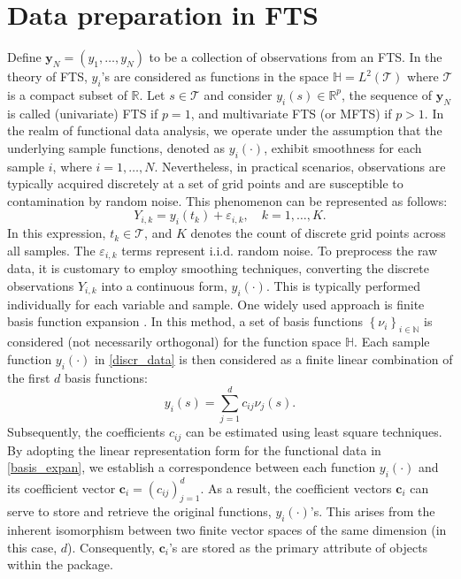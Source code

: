 \section{Data preparation in FTS}\label{sec:preparation}
Define $\textbf{y}_N=(y_1,\ldots,y_N)$ to be a collection of observations from an FTS. In the theory of FTS, $y_i$'s are considered as functions in the space $\mathbb{H}=L^2(\mathcal{T})$ where $\mathcal{T}$ is a compact subset of $\mathbb{R}.$ Let $s\in\mathcal{T}$ and consider $y_i(s)\in\mathbb{R}^p$, the sequence of $\textbf{y}_N$ is called (univariate) FTS if $p=1$, and multivariate FTS (or MFTS) if $p>1.$
In the realm of functional data analysis, we operate under the assumption that the underlying sample functions, denoted as $y_{i}(\cdot)$, exhibit smoothness for each sample $i$, where $i=1, \ldots, N$. Nevertheless, in practical scenarios, observations are typically acquired discretely at a set of grid points and are susceptible to contamination by random noise. This phenomenon can be represented as follows:
\begin{equation}\label{discr_data}
	Y_{i,k} = y_{i}(t_k) +\varepsilon_{i,k}, \quad k=1,\ldots, K.
\end{equation}
In this expression, $t_k\in\mathcal{T}$, and $K$ denotes the count of discrete grid points across all samples. The $\varepsilon_{i,k}$ terms represent i.i.d. random noise.
To preprocess the raw data, it is customary to employ smoothing techniques, converting the discrete observations $Y_{i,k}$ into a continuous form, $y_{i}(\cdot)$. This is typically performed individually for each variable and sample. One widely used approach is finite basis function expansion \citep{ramsay2005}. In this method, a set of basis functions $\left\lbrace \nu_i \right\rbrace_{ i\in\mathbb{N}}$ is considered (not necessarily orthogonal) for the function space $\mathbb{H}$. Each sample function $y_{i}(\cdot)$ in \eqref{discr_data} is then considered as a finite linear combination of the first $d$ basis functions:
\begin{equation}\label{basis_expan}
	y_i(s)= \sum_{j=1}^d c_{ij}\nu_j(s).
\end{equation}
Subsequently, the coefficients $c_{ij}$ can be estimated using least square techniques. By adopting the linear representation form for the functional data in \eqref{basis_expan}, we establish a correspondence between each function $y_i(\cdot)$ and its coefficient vector ${\pmb c}_i=(c_{ij})_{j=1}^d.$ As a result, the coefficient vectors ${\pmb c}_i$ can serve to store and retrieve the original functions, $y_i(\cdot)$'s. This arises from the inherent isomorphism between two finite vector spaces of the same dimension (in this case, $d$). Consequently, ${\pmb c}_i$'s are stored as the primary attribute of  objects within the  package.
